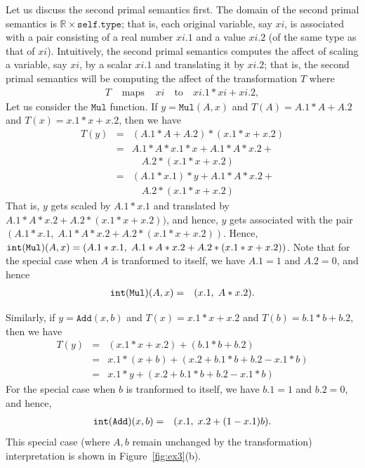 \documentclass[preprint]{sig-alternate-05-2015}
\def\int{{\tt{int}}}
\def\RR{{\mathbb{R}}}
\def\MMul{{\mathtt{Mul}}}
\def\VAdd{{\mathtt{Add}}}
\begin{document}
{Let us discuss the second primal semantics first.
The domain of the second primal semantics is
$\RR\times\mathtt{self.type}$; that is, each original variable,
  say $xi$,
is associated with a pair consisting of a real number
$xi.1$ and a value $xi.2$ (of the same type as that of $xi$).
Intuitively,
the second primal semantics computes the affect of scaling a variable, say $xi$, by a scalar $xi.1$ and translating it by $xi.2$; that is,
the second primal semantics will be computing the affect of the transformation $T$ where
\begin{eqnarray*}
  T & \mbox{ maps } & xi \quad\mbox{to}\quad xi.1*xi + xi.2,
\end{eqnarray*}
Let us consider the $\MMul$ function.
If $y = \MMul(A,x)$ and $T(A) = A.1*A + A.2$
and $T(x) = x.1*x + x.2$, then we have
\begin{eqnarray*}
  T(y) & = & (A.1*A + A.2) * (x.1*x + x.2)
  \\
       & = & A.1*A*x.1*x + A.1*A*x.2 +
  \\   &   & \quad A.2 * (x.1*x + x.2)
  \\
       & = & (A.1*x.1)*y + A.1*A*x.2 +
  \\   &   & \quad A.2 * (x.1*x + x.2)
\end{eqnarray*}
That is, $y$ gets scaled by
$A.1*x.1$ and translated by $A.1*A*x.2+A.2*(x.1*x+x.2))$, and hence,
$y$ gets associated with the pair
$(A.1*x.1,\; A.1*A*x.2+A.2*(x.1*x+x.2))$.
Hence,
$\int(\MMul)(A,x) =
(A.1*x.1,\; A.1*A*x.2+A.2*(x.1*x+x.2))$.
Note that for the special case when $A$ is
tranformed to itself, we have
$A.1 = 1$ and $A.2 = 0$, and hence
\begin{eqnarray*}
  \int(\MMul)(A,x) & = & (x.1,\; A*x.2).
\end{eqnarray*}

Similarly, if $y=\VAdd(x,b)$ and
$T(x)=x.1*x+x.2$ and
$T(b)=b.1*b+b.2$, then we have
\begin{eqnarray*}
  T(y) & = & (x.1*x + x.2) + (b.1*b + b.2)
  \\
       & = & x.1*(x+b) + (x.2+b.1*b+b.2-x.1*b)
  \\
       & = & x.1*y + (x.2+b.1*b+b.2-x.1*b)
\end{eqnarray*}
For the special case when $b$ is tranformed to itself,
we have $b.1=1$ and $b.2=0$, and hence,
\begin{eqnarray*}
  \int(\VAdd)(x,b) & = & (x.1,\; x.2 + (1-x.1)b).
\end{eqnarray*}
This special case (where $A,b$ remain unchanged by the
transformation) interpretation is shown in Figure~\ref{fig:ex3}(b).

}
\end{document}
